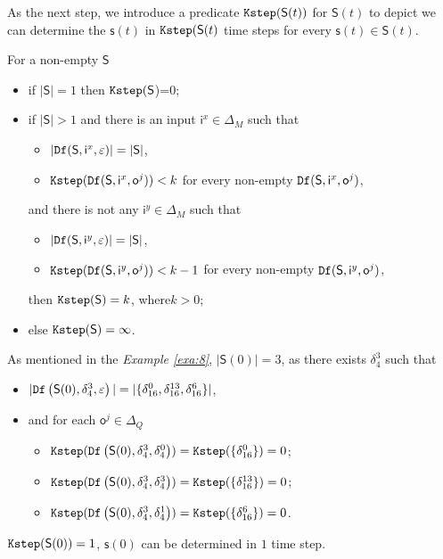 As the next step, we introduce a predicate ${\tt Kstep}(\mathsf{S}(t))$ for $\mathsf{S}(t)$ to depict we can determine the $\mathsf{s}(t)$ in ${\tt Kstep}(\mathsf{S}(t)$ time steps for every $\mathsf{s}(t)\in \mathsf{S}(t)$. 
\begin{definition}[$\Ks(\mathsf{S})$] 
For a non-empty $\mathsf{S}$
 \begin{itemize}
 \item   if $|\mathsf{S}|=1$ then ${\tt Kstep}(\mathsf{S}$)=0;
 \item  if $|\mathsf{S}|>1$ and there is an input $\mathsf{i}^{x} \in \Delta_M$ such that
 \begin{itemize}
 \item  $|{\tt Df}(\mathsf{S},\mathsf{i}^{x},\varepsilon)|=|\mathsf{S}|$,
 \item  ${\tt Kstep}({\tt Df}(\mathsf{S},\mathsf{i}^{x},\mathsf{o}^{j}))< k$ for every non-empty ${\tt Df}(\mathsf{S},\mathsf{i}^{x},\mathsf{o}^{j})$,
 \end{itemize} 
 and there is not any $\mathsf{i}^{y} \in \Delta_M$ such that
  \begin{itemize}
 \item  $|{\tt Df}(\mathsf{S},\mathsf{i}^{y},\varepsilon)|=|\mathsf{S}|$,
 \item  ${\tt Kstep}({\tt Df}(\mathsf{S},\mathsf{i}^{y},\mathsf{o}^{j}))< k-1$ for every non-empty ${\tt Df}(\mathsf{S},\mathsf{i}^{y},\mathsf{o}^{j})$,
 \end{itemize} 
then ${\tt Kstep}(\mathsf{S})=k$, where$k >0$;%
 \item else ${\tt Kstep}(\mathsf{S})=\infty$.
 \end{itemize}
\end{definition}

\begin{example}\label{exa:9}
As mentioned in the {\em Example \ref{exa:8}}, $|\mathsf{S}(0)|=3$, as there exists $\delta_{4}^3$ such that 
 \begin{itemize}
 \item  $|{\tt Df}\left(\mathsf{S}(0),\delta_{4}^3,\varepsilon\right)|=|\{\delta_{16}^0,\delta_{16}^{13},\delta_{16}^6\}|$,
 \item   and for each $\mathsf{o}^{j}\in \Delta_Q$
  \begin{itemize}
  \item   ${\tt Kstep}({\tt Df}\left(\mathsf{S}(0),\delta_{4}^3,\delta_{4}^0\right))={\tt Kstep}(\{\delta_{16}^0\})=0$;
 \item  ${\tt Kstep}({\tt Df}\left(\mathsf{S}(0),\delta_{4}^3,\delta_{4}^3\right))={\tt Kstep}(\{\delta_{16}^{13}\})=0$;
  \item  ${\tt Kstep}({\tt Df}\left(\mathsf{S}(0),\delta_{4}^3,\delta_{4}^1\right))={\tt Kstep}(\{\delta_{16}^{6}\})=0$.
 \end{itemize}
 \end{itemize}
${\tt Kstep}(\mathsf{S}(0))=1$, $\mathsf{s}(0)$ can be determined in $1$ time step.
\end{example}  

